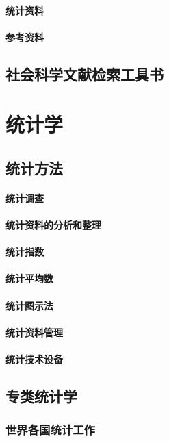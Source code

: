 \documentclass[UTF8]{../RepresentationUniverse}
\begin{document}
    \subsubsection{统计资料}
    \subsubsection{参考资料}

\section{社会科学文献检索工具书}



\chapter{统计学}
\section{统计方法}
    \subsubsection{统计调查}
    \subsubsection{统计资料的分析和整理}
    \subsubsection{统计指数}
    \subsubsection{统计平均数}
    \subsubsection{统计图示法}
    \subsubsection{统计资料管理}
    \subsubsection{统计技术设备}
\section{专类统计学}
    \subsection{世界各国统计工作}
\end{document}

